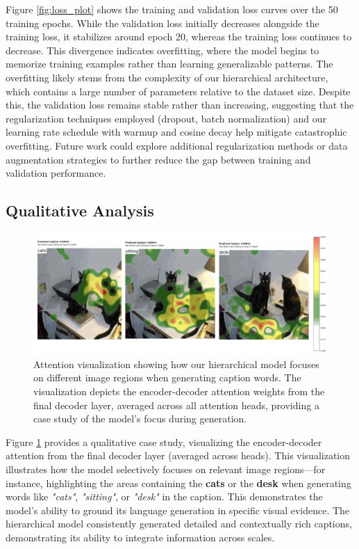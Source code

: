 \documentclass[10pt,twocolumn,letterpaper]{article}
\begin{document}
Figure \ref{fig:loss_plot} shows the training and validation loss curves over the 50 training epochs. While the validation loss initially decreases alongside the training loss, it stabilizes around epoch 20, whereas the training loss continues to decrease. This divergence indicates overfitting, where the model begins to memorize training examples rather than learning generalizable patterns. The overfitting likely stems from the complexity of our hierarchical architecture, which contains a large number of parameters relative to the dataset size. Despite this, the validation loss remains stable rather than increasing, suggesting that the regularization techniques employed (dropout, batch normalization) and our learning rate schedule with warmup and cosine decay help mitigate catastrophic overfitting. Future work could explore additional regularization methods or data augmentation strategies to further reduce the gap between training and validation performance.

\subsection{Qualitative Analysis}

\begin{figure}[ht!]
  \begin{center}
    \includegraphics[width=\textwidth]{figures/attention_visual.png}
  \end{center}
  \caption{Attention visualization showing how our hierarchical model focuses on different image regions when generating caption words. The visualization depicts the encoder-decoder attention weights from the final decoder layer, averaged across all attention heads, providing a case study of the model's focus during generation.}
  \label{fig:attention}
\end{figure}

Figure \ref{fig:attention} provides a qualitative case study, visualizing the encoder-decoder attention from the final decoder layer (averaged across heads). This visualization illustrates how the model selectively focuses on relevant image regions—for instance, highlighting the areas containing the \textbf{cats} or the \textbf{desk} when generating words like \textit{"cats"}, \textit{"sitting"}, or \textit{"desk"} in the caption. This demonstrates the model's ability to ground its language generation in specific visual evidence. The hierarchical model consistently generated detailed and contextually rich captions, demonstrating its ability to integrate information across scales.
\end{document}
